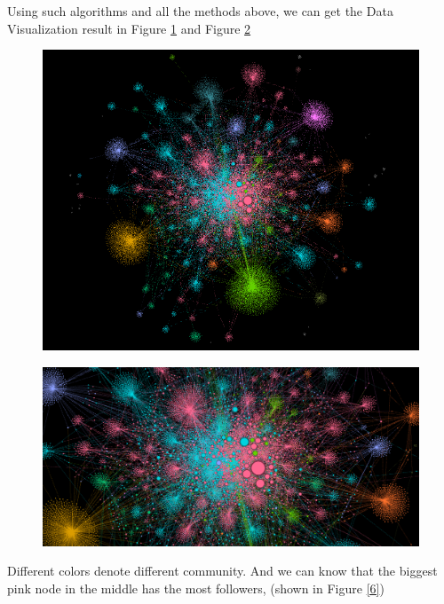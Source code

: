 \documentclass[11pt,a4paper]{article}
\begin{document}
Using such algorithms and all the methods above, we can get the Data Visualization result in Figure \ref{3} and Figure \ref{5}

\begin{figure}[ht]
\centering
\includegraphics[width = \columnwidth]{3.png}
\caption{}
\label{3}
\end{figure}

\begin{figure}[ht]
\centering
\includegraphics[width = \columnwidth]{5.png}
\caption{}
\label{5}
\end{figure}

Different colors denote different community. And we can know that the
biggest pink node in the middle has the most followers, (shown in Figure \ref{6})
\end{document}

